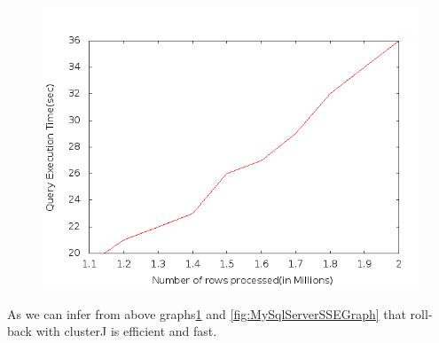 \begin{figure}
\includegraphics[scale=0.65]{figs/preliminar/benchmark_Clusterj.png}
\label{fig:ClusterJSSEGraph}%
\end{figure}

As we can infer from above graphs\ref{fig:ClusterJSSEGraph} and \ref{fig:MySqlServerSSEGraph}  that roll-back with clusterJ is efficient and fast.











